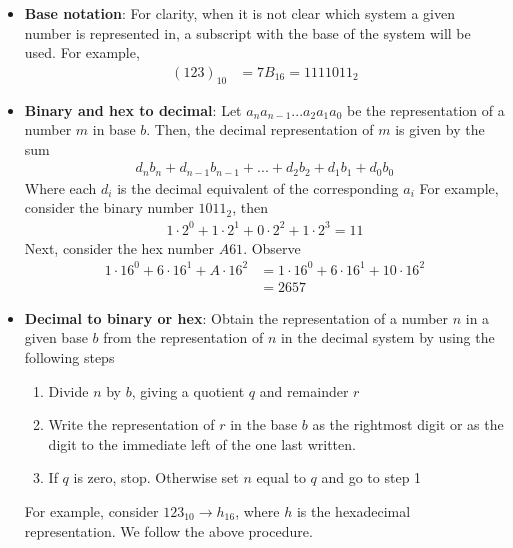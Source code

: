 \documentclass{report}
\begin{document}
\begin{itemize}
\begin{center}
            \end{center}
        \item \textbf{Base notation}: For clarity, when it is not clear which system a given number is represented in, a subscript with the base of the system will be used. For example, 
            \begin{align*}
                (123)_{10} &= 7B_{16} = 1111011_{2}
            \end{align*}
        \item \textbf{Binary and hex to decimal}: Let $a_{n}a_{n-1}...a_{2}a_{1}a_{0} $ be the representation of a number $m$ in base $b$. Then, the decimal representation of $m$ is given by the sum
            \begin{align*}
                d_{n}b_{n} + d_{n-1}b_{n-1} + ... + d_{2}b_{2} +d_{1}b_{1} + d_{0}b_{0}
            \end{align*}
            Where each $d_{i}$ is the decimal equivalent of the corresponding $a_{i}$
            \bigbreak \noindent 
            For example, consider the binary number $1011_{2}$, then
            \begin{align*}
                1\cdot 2^{0} + 1\cdot 2^{1} + 0 \cdot 2^{2} + 1\cdot 2^{3} = 11
            \end{align*}
            Next, consider the hex number $A61$. Observe
            \begin{align*}
                1 \cdot 16^{0} + 6 \cdot 16^{1} + A \cdot 16^{2} &= 1 \cdot 16^{0} + 6 \cdot 16^{1} + 10 \cdot 16^{2} \\
                                                                 &=2657
            \end{align*}
        \item \textbf{Decimal to binary or hex}: Obtain the representation of a number $n$ in a given base $b$ from the representation of $n$ in the decimal system by using the following steps
            \begin{enumerate}
                \item Divide $n$ by $b$, giving a quotient $q$ and remainder $r$
                \item Write the representation of $r$ in the base $b$  as the rightmost digit or as the digit to the immediate left of the one last written.
                \item If $q$ is zero, stop. Otherwise set $n$ equal to $q$ and go to step 1
            \end{enumerate}
            For example, consider $123_{10} \to h_{16} $, where $h$ is the hexadecimal representation. We follow the above procedure.

\end{itemize}
\end{document}
